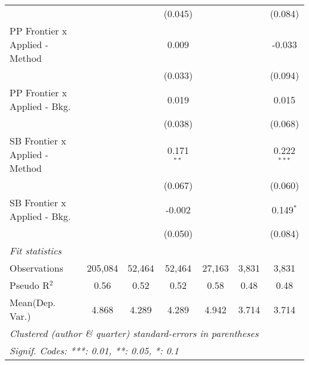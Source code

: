 \begin{tabular}{lcccccc}
                                  &              &              & (0.045)       &               &              & (0.084)\\   
   PP Frontier x Applied - Method &              &              & 0.009         &               &              & -0.033\\   
                                  &              &              & (0.033)       &               &              & (0.094)\\   
   PP Frontier x Applied - Bkg.   &              &              & 0.019         &               &              & 0.015\\   
                                  &              &              & (0.038)       &               &              & (0.068)\\   
   SB Frontier x Applied - Method &              &              & 0.171$^{**}$  &               &              & 0.222$^{***}$\\   
                                  &              &              & (0.067)       &               &              & (0.060)\\   
   SB Frontier x Applied - Bkg.   &              &              & -0.002        &               &              & 0.149$^{*}$\\   
                                  &              &              & (0.050)       &               &              & (0.084)\\   
   \midrule
   \emph{Fit statistics}\\
   Observations                   & 205,084      & 52,464       & 52,464        & 27,163        & 3,831        & 3,831\\  
   Pseudo R$^2$                   & 0.56         & 0.52         & 0.52          & 0.58          & 0.48         & 0.48\\  
Mean(Dep. Var.) & 4.868 & 4.289 & 4.289 & 4.942 & 3.714 & 3.714 \\
   \midrule \midrule
   \multicolumn{7}{l}{\emph{Clustered (author \& quarter) standard-errors in parentheses}}\\
   \multicolumn{7}{l}{\emph{Signif. Codes: ***: 0.01, **: 0.05, *: 0.1}}\\
\end{tabular}
\par\endgroup
